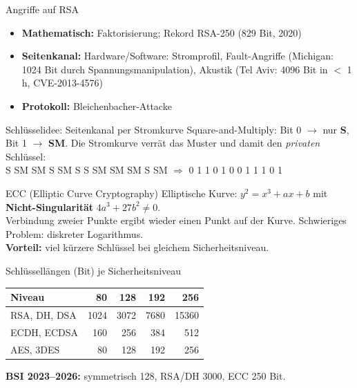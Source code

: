 \documentclass[a4paper, fontsize=7pt]{scrartcl}
\renewcommand*{\arraystretch}{1.5}  %
\begin{document}
\begin{mainbox}{Angriffe auf RSA}
\begin{itemize}
    \item \textbf{Mathematisch:} Faktorisierung; Rekord RSA-250
          (829 Bit, 2020)
    \item \textbf{Seitenkanal:} Hardware/Software: Stromprofil, Fault-Angriffe
          (Michigan: 1024 Bit durch Spannungsmanipulation), Akustik
          (Tel Aviv: 4096 Bit in $<$ 1\,h, CVE-2013-4576)
    \item \textbf{Protokoll:} Bleichenbacher-Attacke
\end{itemize}
\end{mainbox}

\begin{subbox}{Schlüsselidee: Seitenkanal per Stromkurve}
Square-and-Multiply: Bit 0 $\to$ nur \textbf{S}, Bit 1 $\to$ \textbf{SM}.
Die Stromkurve verrät das Muster und damit den \emph{privaten} Schlüssel:\\
S SM SM S SM S S SM SM SM S SM $\Rightarrow$ 0 1 1 0 1 0 0 1 1 1 0 1
\end{subbox}

\begin{mainbox}{ECC (Elliptic Curve Cryptography)}
Elliptische Kurve: $y^2 = x^3 + ax + b$ mit
\textbf{Nicht-Singularität} $4a^3 + 27b^2 \neq 0$.\\
Verbindung zweier Punkte ergibt wieder einen Punkt auf der Kurve.
Schwieriges Problem: diskreter Logarithmus.\\
\textbf{Vorteil:} viel kürzere Schlüssel bei gleichem Sicherheitsniveau.
\end{mainbox}

\begin{mainbox}{Schlüssellängen (Bit) je Sicherheitsniveau}
\renewcommand*{\arraystretch}{1.15}
\setlength{\tabcolsep}{3pt}
\begin{center}
\begin{tabular}{l|r|r|r|r}
\textbf{Niveau} & \textbf{80} & \textbf{128} & \textbf{192} & \textbf{256} \\
\hline
RSA, DH, DSA & 1024 & 3072 & 7680 & 15360 \\
ECDH, ECDSA & 160 & 256 & 384 & 512 \\
AES, 3DES & 80 & 128 & 192 & 256 \\
\end{tabular}
\end{center}
\textbf{BSI 2023--2026:} symmetrisch 128, RSA/DH 3000, ECC 250 Bit.
\end{mainbox}
\end{document}
